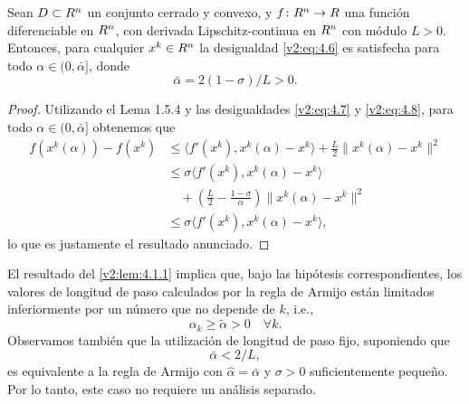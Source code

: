 \begin{lemma}\label{v2:lem:4.1.1}
    Sean $D \subset R^n$ un conjunto cerrado y convexo, y $f \colon R^n \to R$ una función diferenciable en $R^n$, con derivada Lipschitz-continua en $R^n$ con módulo $L > 0$.
    Entonces, para cualquier $x^k \in R^n$ la desigualdad \eqref{v2:eq:4.6} es satisfecha para todo $\alpha \in (0, \bar{\alpha}]$, donde
    \begin{equation}
        \bar{\alpha} = 2(1 - \sigma)/L > 0.
        \label{v2:eq:4.8}
    \end{equation}
\end{lemma}
\begin{proof}
    Utilizando el Lema 1.5.4 y las desigualdades \eqref{v2:eq:4.7} y \eqref{v2:eq:4.8}, para todo $\alpha \in (0, \bar{\alpha}]$ obtenemos que
    \begin{align*}
        f(x^k(\alpha)) - f(x^k) &\le \langle f'(x^k), x^k(\alpha) - x^k \rangle + \frac{L}{2} \|x^k(\alpha) - x^k\|^2 \\
        &\le \sigma \langle f'(x^k), x^k(\alpha) - x^k \rangle \\
        &\quad + \left( \frac{L}{2} - \frac{1-\sigma}{\alpha} \right) \|x^k(\alpha) - x^k\|^2 \\
        &\le \sigma \langle f'(x^k), x^k(\alpha) - x^k \rangle,
    \end{align*}
    lo que es justamente el resultado anunciado.
\end{proof}

El resultado del \cref{v2:lem:4.1.1} implica que, bajo las hipótesis correspondientes, los valores de longitud de paso calculados por la regla de Armijo están limitados inferiormente por un número que no depende de $k$, i.e.,
\begin{equation}
    \alpha_k \ge \tilde{\alpha} > 0 \quad \forall k.
    \label{v2:eq:4.9}
\end{equation}
Observamos también que la utilización de longitud de paso fijo, suponiendo que
\begin{equation}
    \bar{\alpha} < 2/L,
    \label{v2:eq:4.10}
\end{equation}
es equivalente a la regla de Armijo con $\hat{\alpha} = \bar{\alpha}$ y $\sigma > 0$ suficientemente pequeño. Por lo tanto, este caso no requiere un análisis separado.

